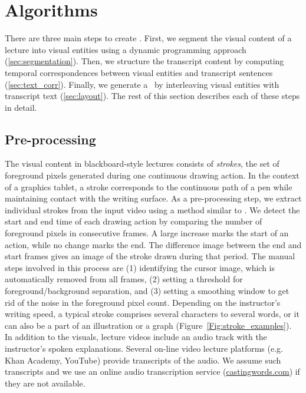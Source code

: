 \section{Algorithms}
There are three main steps to create \systemname . First, we
segment the visual content of a lecture into visual entities using a
dynamic programming approach (\ref{sec:segmentation}). Then, we 
structure the transcript content by computing temporal correspondences
between visual entities and transcript sentences
(\ref{sec:text_corr}). Finally, we generate a \systemname\ by interleaving visual entities with transcript text (\ref{sec:layout}). The rest of this section describes each of these steps in detail.
%
\subsection{Pre-processing}
The visual content in blackboard-style lectures consists of \emph{strokes},
the set of foreground pixels generated during one continuous drawing action.
In the context of a graphics tablet, a stroke corresponds to the continuous
path of a pen while maintaining contact with the writing surface.  As a pre-processing step, we extract
individual strokes from the input video using a method similar to
\cite{monserrat2013notevideo}.  We detect the start and end time of
each drawing action by comparing the number of foreground pixels in
consecutive frames. A large increase marks the start of an action,
while no change marks the end. The difference image between the end
and start frames gives an image of the stroke drawn during that
period.
The manual steps involved in this process are (1) identifying the cursor image, which is automatically removed from all frames, (2) setting a threshold for foreground/background separation, and (3)  setting a smoothing window to get rid of the noise in the foreground pixel count. Depending on the instructor's writing speed, a typical stroke
comprises several characters to several words, or it can also be a
part of an illustration or a graph (Figure~\ref{Fig:stroke_examples}).\\

In addition
to the visuals, lecture videos include an audio track with the instructor's
spoken explanations. Several on-line video lecture platforms (e.g. Khan Academy,
YouTube) provide transcripts of the audio. We assume such transcripts and
we use an online audio transcription service (\url{castingwords.com}) if they are
not available. 
%
